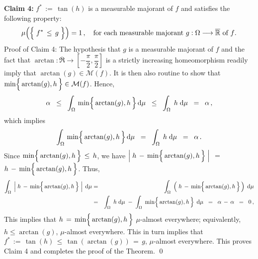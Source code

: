 \vskip 0.8cm
\noindent
\textbf{Claim 4:}\quad
$f^{*} \, := \, \tan(h)$ is a measurable majorant of $f$ and satisfies the following property:
\begin{equation*}
\mu\!\left(\left\{\;f^{*} \,\overset{{\color{white}.}}{\leq}\, g \;\right\}\right) =1\,,
\quad
\textnormal{for each measurable majorant $g : \Omega \longrightarrow \overline{\Re}$ of $f$}.
\end{equation*}
Proof of Claim 4:\;\;
\noindent
The hypothesis that $g$ is a measurable majorant of $f$ and the fact that
$\arctan : \overline{\Re} \longrightarrow \left[-\dfrac{\pi}{2},\dfrac{\pi}{2}\right]$
is a strictly increasing homeomorphism readily imply that $\arctan(g) \in \mathcal{M}(f)$.
It is then also routine to show that $\min\!\left\{\,\arctan(g),\overset{{\color{white}.}}{h}\,\right\} \in \mathcal{M}(f)$.
Hence,
\begin{equation*}
\alpha
\;\; \leq \;\;
	\int_{\Omega}\,\min\!\left\{\,\arctan(g),\overset{{\color{white}.}}{h}\,\right\}\d\mu
\;\; \leq \;\;
	\int_{\Omega}\;h\;\d\mu
\;\; = \;\;
	\alpha\,,
\end{equation*}
which implies
\begin{equation*}
\int_{\Omega}\,\min\!\left\{\,\arctan(g),\overset{{\color{white}.}}{h}\,\right\}\d\mu
\;\; = \;\;
	\int_{\Omega}\;h\;\d\mu
\;\; = \;\;
	\alpha\,.
\end{equation*}
Since $\min\!\left\{\,\arctan(g),\overset{{\color{white}.}}{h}\,\right\} \,\leq\, h$, we have
\;$\left\vert\; h \, - \, \min\!\left\{\,\arctan(g),\overset{{\color{white}.}}{h}\,\right\} \;\right\vert$
\;$=$\;
$h \, - \, \min\!\left\{\,\arctan(g),\overset{{\color{white}.}}{h}\,\right\}$.\;
Thus,
\begin{eqnarray*}
\int_{\Omega}\;\left\vert\; h \, - \, \min\!\left\{\,\arctan(g),\overset{{\color{white}.}}{h}\,\right\} \;\right\vert\;\d\mu
& = &
	\int_{\Omega}\; \left(\;h \, - \, \min\!\left\{\,\arctan(g),\overset{{\color{white}.}}{h}\,\right\}\,\right)\;\d\mu
\\
& = &
	\int_{\Omega}\; h \;\d\mu
	\; - \;
	\int_{\Omega}\; \min\!\left\{\,\arctan(g),\overset{{\color{white}.}}{h}\,\right\}\;\d\mu
\;\; = \;\;
	\alpha \, - \, \alpha
\;\; = \;\;
	0\,,
\end{eqnarray*}
This implies that $h \, = \, \min\!\left\{\,\arctan(g),\overset{{\color{white}.}}{h}\,\right\}$
$\mu$-almost everywhere;
equivalently, $h \leq \arctan(g)$, $\mu$-almost everywhere.
This in turn implies that
$f^{*} \,:=\, \tan(h) \,\leq\, \tan\!\left(\arctan(g)\right) \,=\, g$, $\mu$-almost everywhere.
This proves Claim 4 and completes the proof of the Theorem.
\qed

